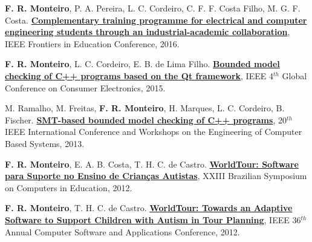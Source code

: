 \documentclass[letterpaper]{article}
\renewenvironment{itemize}{
  \begin{list}{}{
    \setlength{\leftmargin}{1.5em}
  }
}{
  \end{list}
}
\begin{document}
\begin{itemize}
  \item {\bf F. R. Monteiro}, P. A. Pereira, L. C. Cordeiro, C. F. F. Costa Filho, M. G. F. Costa. \href{http://ieeexplore.ieee.org/abstract/document/7757421/}{{\bf Complementary training programme for electrical and computer engineering students through an industrial-academic collaboration}},
  IEEE Frontiers in Education Conference, 2016.
  
    \item {\bf F. R. Monteiro}, L. C. Cordeiro, E. B. de Lima Filho. \href{http://ieeexplore.ieee.org/abstract/document/7398699/}{{\bf Bounded model checking of C++ programs based on the Qt framework}},
  IEEE 4$^{th}$ Global Conference on Consumer Electronics, 2015.
    
  \item M. Ramalho, M. Freitas, {\bf F. R. Monteiro}, H. Marques, L. C. Cordeiro, B. Fischer. \href{http://ieeexplore.ieee.org/abstract/document/6601583/}{{\bf SMT-based bounded model checking of C++ programs}},
  20$^{th}$ IEEE International Conference and Workshops on the Engineering of Computer Based Systems, 2013.

    \item {\bf F. R. Monteiro}, E. A. B. Costa, T. H. C. de Castro. \href{http://www.br-ie.org/pub/index.php/sbie/article/view/1806}{{\bf WorldTour: Software para Suporte no Ensino de Crian{\c c}as Autistas}},
  XXIII Brazilian Symposium on Computers in Education, 2012.
    
    \item {\bf F. R. Monteiro}, T. H. C. de Castro. \href{http://ieeexplore.ieee.org/abstract/document/6340181/}{{\bf WorldTour: Towards an Adaptive Software to Support Children with Autism in Tour Planning}},
  IEEE 36$^{th}$ Annual Computer Software and Applications Conference, 2012.

\end{itemize}
\end{document}
